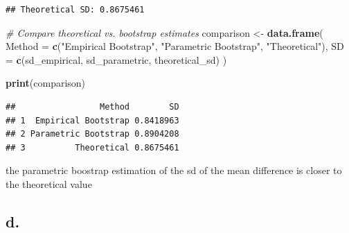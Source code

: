 \documentclass[
]{article}
\newenvironment{Shaded}{\begin{snugshade}}{\end{snugshade}}
\newcommand{\AttributeTok}[1]{\textcolor[rgb]{0.13,0.29,0.53}{#1}}
\newcommand{\CommentTok}[1]{\textcolor[rgb]{0.56,0.35,0.01}{\textit{#1}}}
\newcommand{\FunctionTok}[1]{\textcolor[rgb]{0.13,0.29,0.53}{\textbf{#1}}}
\newcommand{\NormalTok}[1]{#1}
\newcommand{\OtherTok}[1]{\textcolor[rgb]{0.56,0.35,0.01}{#1}}
\newcommand{\StringTok}[1]{\textcolor[rgb]{0.31,0.60,0.02}{#1}}
\begin{document}
\begin{verbatim}
## Theoretical SD: 0.8675461
\end{verbatim}

\begin{Shaded}
\begin{Highlighting}[]
\CommentTok{\# Compare theoretical vs. bootstrap estimates}
\NormalTok{comparison }\OtherTok{\textless{}{-}} \FunctionTok{data.frame}\NormalTok{(}
  \AttributeTok{Method =} \FunctionTok{c}\NormalTok{(}\StringTok{"Empirical Bootstrap"}\NormalTok{, }\StringTok{"Parametric Bootstrap"}\NormalTok{, }\StringTok{"Theoretical"}\NormalTok{),}
  \AttributeTok{SD =} \FunctionTok{c}\NormalTok{(sd\_empirical, sd\_parametric, theoretical\_sd)}
\NormalTok{)}

\FunctionTok{print}\NormalTok{(comparison)}
\end{Highlighting}
\end{Shaded}

\begin{verbatim}
##                 Method        SD
## 1  Empirical Bootstrap 0.8418963
## 2 Parametric Bootstrap 0.8904208
## 3          Theoretical 0.8675461
\end{verbatim}

the parametric boostrap estimation of the sd of the mean difference is
closer to the theoretical value

\subsection{d.}\label{d.}
\end{document}
